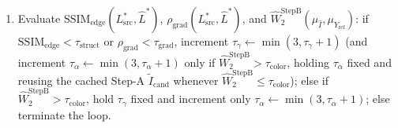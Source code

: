 \documentclass[conference,10pt]{IEEEtran}
\begin{document}
\begin{enumerate}
    \item Evaluate $\mathrm{SSIM}_{\text{edge}}(L^*_{\text{src}}, \widehat{L}^*)$, $\rho_{\text{grad}}(L^*_{\text{src}}, \widehat{L}^*)$, and $\widehat{W}_2^{\text{StepB}}(\mu_{\widehat{I}}, \mu_{Y_{\text{ref}}})$: if $\mathrm{SSIM}_{\text{edge}} < \tau_{\text{struct}}$ or $\rho_{\text{grad}} < \tau_{\text{grad}}$, increment $\tau_\gamma \leftarrow \min(3, \tau_\gamma+1)$ (and increment $\tau_\alpha \leftarrow \min(3, \tau_\alpha+1)$ only if $\widehat{W}_2^{\text{StepB}} > \tau_{\text{color}}$, holding $\tau_\alpha$ fixed and reusing the cached Step-A $\widetilde{I}_{\text{cand}}$ whenever $\widehat{W}_2^{\text{StepB}} \le \tau_{\text{color}}$); else if $\widehat{W}_2^{\text{StepB}} > \tau_{\text{color}}$, hold $\tau_\gamma$ fixed and increment only $\tau_\alpha \leftarrow \min(3, \tau_\alpha+1)$; else terminate the loop.
\end{enumerate}
\end{document}

